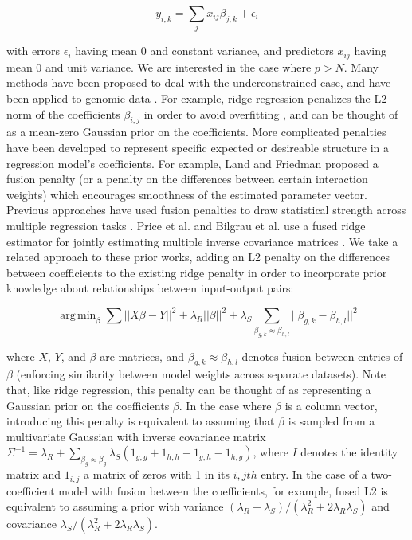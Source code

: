 \documentclass[11pt]{article}
\DeclareMathOperator*{\argmin}{arg\,min}
\begin{document}
\begin{equation}
y_{i,k} = \displaystyle\sum_{j}x_{ij}\beta_{j,k} + \epsilon_i
\end{equation}

with errors $\epsilon_i$ having mean 0 and constant variance, and predictors $x_{ij}$ having mean 0 and unit variance. We are interested in the case where $p > N$. Many methods have been proposed to deal with the underconstrained case, and have been applied to genomic data \cite{waldron_optimized_2011, li_network-constrained_2008}. For example, ridge regression penalizes the L2 norm of the coefficients $\beta_{i,j}$ in order to avoid overfitting \cite{hoerl_ridge_1970}, and can be thought of as a mean-zero Gaussian prior on the coefficients. 
More complicated penalties have been developed to represent specific expected or desireable structure in a regression model's coefficients. 
For example, Land and Friedman \cite{citeulike3780356} proposed a fusion penalty (or a penalty on the differences between certain interaction weights) which encourages smoothness of the estimated parameter vector. Previous approaches have used  fusion penalties to draw statistical strength across multiple regression tasks \cite{kim_tree-guided_2012,Land1997,Chen2010,Petry2011,Hebiri2011}. 
Price et al. and Bilgrau et al. use a fused ridge estimator for jointly estimating multiple inverse covariance matrices \cite{Price2014a,Bilgrau2015}.
We take a related approach to these prior works, adding an L2 penalty on the differences between coefficients to the existing ridge penalty in order to incorporate prior knowledge about relationships between input-output pairs:

\begin{equation}
\argmin_{\beta} \displaystyle\sum \vert \vert X\beta - Y \vert \vert ^2 + \lambda_R \vert \vert \beta \vert \vert ^2 +  \lambda_S  \displaystyle \sum_{\beta_{g,k} \approx \beta_{h,l}} || \beta_{g,k} - \beta_{h,l} ||^2
\label{eqn:main}
\end{equation}

where $X$, $Y$, and $\beta$ are matrices, and $\beta_{g,k} \approx \beta_{h,l}$ denotes fusion between entries of $\beta$ (enforcing similarity between model weights across separate datasets). 
Note that, like ridge regression, this penalty can be thought of as representing a Gaussian prior on the coefficients $\beta$. 
In the case where $\beta$ is a column vector, introducing this penalty is equivalent to assuming that $\beta$ is sampled from a multivariate Gaussian with inverse covariance matrix $\Sigma^{-1} = \lambda_R + \displaystyle \sum_{\beta_g \approx \beta_g} \lambda_S (1_{g,g} + 1_{h,h} - 1_{g,h} - 1_{h,g})$, where $I$ denotes the identity matrix and $1_{i,j}$ a matrix of zeros with 1 in its $i, jth$ entry. 
In the case of a two-coefficient model with fusion between the coefficients, for example, fused L2 is equivalent to assuming a prior with variance $(\lambda_R + \lambda_S)/(\lambda_R^2+2\lambda_R\lambda_S)$ and covariance $\lambda_S/(\lambda_R^2+2\lambda_R\lambda_S)$.
\end{document}

